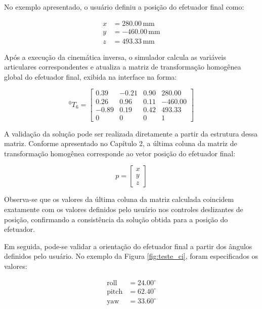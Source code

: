 No exemplo apresentado, o usuário definiu a posição do efetuador final como:

\begin{align}
x &= 280.00\,\mathrm{mm} \\
y &= -460.00\,\mathrm{mm} \\
z &= 493.33\,\mathrm{mm}
\end{align}

Após a execução da cinemática inversa, o simulador calcula as variáveis articulares correspondentes e atualiza a matriz de transformação homogênea global do efetuador final, exibida na interface na forma:

\begin{equation}
^0T_6 =
\begin{bmatrix}
0.39 & -0.21 & 0.90 & 280.00 \\
0.26 & 0.96 & 0.11 & -460.00 \\
-0.89 & 0.19 & 0.42 & 493.33 \\
0 & 0 & 0 & 1
\end{bmatrix}
\end{equation}

A validação da solução pode ser realizada diretamente a partir da estrutura dessa matriz. Conforme apresentado no Capítulo 2, a última coluna da matriz de transformação homogênea corresponde ao vetor posição do efetuador final:

\begin{equation}
p =
\begin{bmatrix}
x \\
y \\
z
\end{bmatrix}
\end{equation}

Observa-se que os valores da última coluna da matriz calculada coincidem exatamente com os valores definidos pelo usuário nos controles deslizantes de posição, confirmando a consistência da solução obtida para a posição do efetuador.

Em seguida, pode-se validar a orientação do efetuador final a partir dos ângulos definidos pelo usuário. No exemplo da Figura \ref{fig:teste_ci}, foram especificados os valores:

\begin{align}
\text{roll} &= 24.00^\circ \\
\text{pitch} &= 62.40^\circ \\
\text{yaw} &= 33.60^\circ
\end{align}

